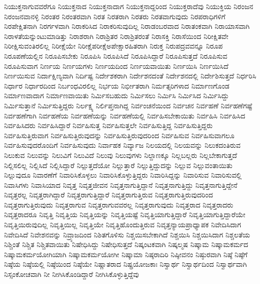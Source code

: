 {ನಿಯುಕ್ತನಾಗುವವರೆಗೂ
ನಿಯುಕ್ತನಾದ
ನಿಯುಕ್ತನಾದಾಗ
ನಿಯುಕ್ತನಾದ್ದರಿಂದ
ನಿಯುಕ್ತರಾದೆವು
ನಿಯುಕ್ತಿಯ
ನಿರಂಜನ
ನಿರಂಜನವಾನಳ್ಳಿ
ನಿರಂತರ
ನಿರಂತರವಾಗಿ
ನಿರತ
ನಿರತರಾಗಿ
ನಿರತರು
ನಿರತವಾಗುವುದು
ನಿರಪರಾಧಿಗಳಿಗೆ
ನಿರಪೇಕ್ಷಿತನಾಗಿ
ನಿರರ್ಗಳವಾಗಿ
ನಿರಾಕರಿಸಿದ
ನಿರಾಕರಿಸುವುದಿಲ್ಲ
ನಿರಾಡಂಬರವಾದ
ನಿರಾತಂಕವಾಗಿ
ನಿರಾಯಾಸವಾಗಿ
ನಿರಾಳತೆಯನ್ನುಂಟುಮಾಡಿತ್ತು
ನಿರಾಶರಾಗಿ
ನಿರಾಶ್ರಿತರ
ನಿರಾಶ್ರಿತರಂತೆ
ನಿರಾಸಕ್ತಿ
ನಿರಾಸೆಯಿಂದ
ನಿರೀಕ್ಷಿತವೇ
ನಿರೀಕ್ಷಿಸುವಂತಿರಲಿಲ್ಲ
ನಿರೀಕ್ಷೆಯೇ
ನಿರೀಕ್ಷೆಪರೀಕ್ಷೆಅಪೇಕ್ಷಾರಹಿತರಾಗಿ
ನಿರುಕ್ತ
ನಿರುಪದ್ರವವನ್ನೂ
ನಿರೂಪ
ನಿರೂಪಣೆಯಲ್ಲಿನ
ನಿರೂಪಿಸಬೇಕು
ನಿರೂಪಿಸಿ
ನಿರೂಪಿಸಿದೆ
ನಿರೂಪಿಸಿದ್ದಾರೆ
ನಿರೂಪಿಸುತ್ತದೆ
ನಿರೂಪಿಸುವ
ನಿರೂಪಿಸುವಾಗ
ನಿರ್ಣಯ
ನಿರ್ಣಯಗಳು
ನಿರ್ಣಯದಿಂದ
ನಿರ್ಣಯವಾಯಿತು
ನಿರ್ಣಯಿಸಿ
ನಿರ್ಣಯಿಸಿದೆ
ನಿರ್ಣಯಿಸುವ
ನಿರ್ದಾಕ್ಷಿಣ್ಯವಾಗಿ
ನಿರ್ದಿಷ್ಟ
ನಿರ್ದೇಶಕರಾಗಿ
ನಿರ್ದೇಶನದಂತೆ
ನಿರ್ದೇಶನದಲ್ಲಿ
ನಿರ್ದೇಶಿಸುತ್ತದೆ
ನಿರ್ಧರಿಸಿ
ನಿರ್ಧಾರ
ನಿರ್ಧಾರದಿಂದ
ನಿರ್ಬಂಧವಿರಲಿಲ್ಲ
ನಿರ್ಭಯ
ನಿರ್ಭೀತರಾಗಿ
ನಿರ್ಮತ್ಸರಿಗಳಾದ
ನಿರ್ಮಾಣಗೊಂಡ
ನಿರ್ಮಾಣವಾದಾಗ
ನಿರ್ಮಾಣವಾಯಿತು
ನಿರ್ಮಿಸಬಹುದು
ನಿರ್ಮಿಸಲು
ನಿರ್ಮಿಸಿ
ನಿರ್ಮಿಸಿದ
ನಿರ್ಮಿಸಿದ್ದು
ನಿರ್ಮಿಸುತ್ತಾನೆ
ನಿರ್ಮಿಸುತ್ತಿದ್ದರು
ನಿರ್ಲಕ್ಷ್ಯ
ನಿರ್ಲಿಪ್ತನಾಗಿದ್ದ
ನಿರ್ವಂಚನೆಯಿಂದ
ನಿರ್ವಚನ
ನಿರ್ವಹಣೆ
ನಿರ್ವಹಣೆಗಷ್ಟೆ
ನಿರ್ವಹಣೆಗಾಗಿ
ನಿರ್ವಹಣೆಯ
ನಿರ್ವಹಣೆಯನ್ನು
ನಿರ್ವಹಣೆಯಲ್ಲಿ
ನಿರ್ವಹಿಸಬೇಕಾಯಿತು
ನಿರ್ವಹಿಸಿ
ನಿರ್ವಹಿಸಿದ
ನಿರ್ವಹಿಸಿದರು
ನಿರ್ವಹಿಸಿದ್ದಾರೆ
ನಿರ್ವಹಿಸುತ್ತ
ನಿರ್ವಹಿಸುತ್ತಲೇ
ನಿರ್ವಹಿಸುತ್ತಿದ್ದ
ನಿರ್ವಹಿಸುತ್ತಿದ್ದರು
ನಿರ್ವಹಿಸುತ್ತಿರುವಾಗ
ನಿರ್ವಹಿಸುತ್ತಿರುವುದನ್ನು
ನಿರ್ವಹಿಸುತ್ತಿರುವುದರಿಂದ
ನಿರ್ವಹಿಸುವ
ನಿರ್ವಹಿಸುವಾಗಲೂ
ನಿರ್ವಹಿಸುವುದರೊಂದಿಗೆ
ನಿರ್ವಹಿಸುವುದು
ನಿರ್ವಾಹಕ
ನಿರ್ವ್ಯಾಜ
ನಿಲಯದಲ್ಲಿ
ನಿಲಯವನ್ನು
ನಿಲುಕದಂತಿರುವ
ನಿಲುಕುವ
ನಿಲುವನ್ನು
ನಿಲುವಿಗೆ
ನಿಲುವಿದೆ
ನಿಲುವು
ನಿಲುವುಗಳು
ನಿಲ್ದಾಣಕ್ಕೂ
ನಿಲ್ಲಬಲ್ಲರು
ನಿಲ್ಲಬೇಕಾಗುತ್ತದೆ
ನಿಲ್ಲಿಸಲಿಲ್ಲ
ನಿಲ್ಲಿಸಿದೆ
ನಿಲ್ಲಿಸಿದ್ದಾರೆ
ನಿಲ್ಲುತ್ತದೆಯೋ
ನಿಲ್ಲುತ್ತಾರೆ
ನಿಲ್ಲುತ್ತಿದ್ದುದನ್ನು
ನಿಲ್ಲುವ
ನಿಲ್ಲುವಂತಾಯಿತು
ನಿಲ್ಲುವುದೂ
ನಿವಾರಣೆಗೆ
ನಿವಾರಿಸಿಕೊಳ್ಳಲು
ನಿವಾರಿಸಿಕೊಳ್ಳುತ್ತಿದ್ದರು
ನಿವಾರಿಸಿದ್ದನ್ನು
ನಿವಾರಿಸುವ
ನಿವಾರಿಸುವಲ್ಲಿ
ನಿವಾಸಿಗಳು
ನಿವಾಸಿಯಾದ
ನಿವೃತ್ತ
ನಿವೃತ್ತಜೀವನ
ನಿವೃತ್ತನಾಗುತ್ತಿದ್ದಾನೆ
ನಿವೃತ್ತನಾಗುತ್ತಿದ್ದು
ನಿವೃತ್ತನಾಗುತ್ತಿದ್ದೇನೆ
ನಿವೃತ್ತರಲ್ಲ
ನಿವೃತ್ತರಾಗಿದ್ದಾರೆ
ನಿವೃತ್ತರಾಗುತ್ತಿದ್ದಾರೆ
ನಿವೃತ್ತರಾಗುತ್ತಿರುವ
ನಿವೃತ್ತರಾಗುತ್ತಿರುವುದರಿಂದ
ನಿವೃತ್ತರಾಗುತ್ತಿರುವುದು
ನಿವೃತ್ತರಾಗುವ
ನಿವೃತ್ತರಾಗುವವರಲ್ಲ
ನಿವೃತ್ತರಾಗುವುದು
ನಿವೃತ್ತರಾದ
ನಿವೃತ್ತರಾದರು
ನಿವೃತ್ತರಾದರೂ
ನಿವೃತ್ತಿ
ನಿವೃತ್ತಿಯ
ನಿವೃತ್ತಿಯನ್ನು
ನಿವೃತ್ತಿಯಷ್ಟೆ
ನಿವೃತ್ತಿಯಾಗುತ್ತಿದ್ದಾರೆ
ನಿವೃತ್ತಿಯಾಗುತ್ತಿದ್ದಾರೆಯೇ
ನಿವೃತ್ತಿಯಿರುವುದಿಲ್ಲ
ನಿವೃತ್ತಿಯಿಲ್ಲ
ನಿವೃತ್ತಿಯೇ
ನಿವೃತ್ತಿಹೊಂದುತ್ತಿರುವ
ನಿವೃತ್ತನ್ಯಾಯಪ್ರಾಧ್ಯಾಪಕ
ನಿವೇದಿಸಿದಾಗ
ನಿವೇದಿಸಿದೆ
ನಿವೇಶನವನ್ನು
ನಿವ್ರ್ಯಾಜದಿಂದ
ನಿಶಿತಗೊಳಿಸು
ನಿಶ್ಚಯಿಸಬೇಕಾಗಿದೆ
ನಿಶ್ಚಯಿಸಿ
ನಿಶ್ಚಯಿಸಿದಾಗ
ನಿಶ್ಚಲತೆಯ
ನಿಶ್ಚಿಂತೆ
ನಿಶ್ಚಿತ
ನಿಶ್ಚಿತವಾಯಿತು
ನಿಷೇಧಿಸಿದ್ದು
ನಿಷೇಧಿಸುತ್ತದೆ
ನಿಷ್ಕಂಟಕವಾಗಿ
ನಿಷ್ಕಲ್ಮಷ
ನಿಷ್ಕಾಮ
ನಿಷ್ಕಾಮಕರ್ಮದ
ನಿಷ್ಕಾಮಕರ್ಮಯೋಗಿಯಾಗಿ
ನಿಷ್ಕಾಮಕರ್ಮಯೋಗೀ
ನಿಷ್ಕಾಮಾ
ನಿಷ್ಠರಾದಿರಿ
ನಿಷ್ಠೀವನಂ
ನಿಷ್ಠುರವಾಗಿ
ನಿಷ್ಠೆ
ನಿಷ್ಠೆಗೆ
ನಿಷ್ಠೆಯ
ನಿಷ್ಠೆಯಲ್ಲಿ
ನಿಷ್ಠೆಯಿಂದ
ನಿಷ್ಠೆಯೇ
ನಿಷ್ಣಾತರಾದ
ನಿಷ್ಪ್ರಯೋಜಕಾಃ
ನಿಸ್ವಾರ್ಥ
ನಿಸ್ವಾರ್ಥದಿಂದ
ನಿಸ್ವಾರ್ಥವಾಗಿ
ನಿಸ್ಸಂಕೋಚವಾಗಿ
ನೀ
ನೀಗಿಸಿಕೊಂಡಿದ್ದಾರೆ
ನೀಗಿಸಿಕೊಳ್ಳುತ್ತಿದ್ದೆವು
}
